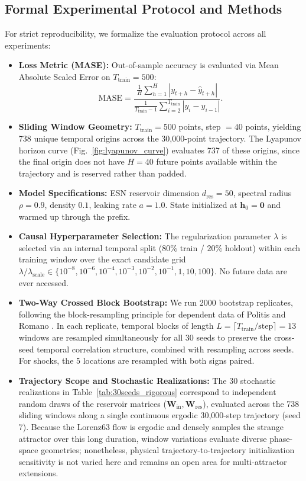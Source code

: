 \documentclass[aip,cha,reprint,amsmath,amssymb]{revtex4-2}
\begin{document}
\subsection{Formal Experimental Protocol and Methods}

For strict reproducibility, we formalize the evaluation protocol across all experiments:
\begin{itemize}
    \item \textbf{Loss Metric (MASE):} Out-of-sample accuracy is evaluated via Mean Absolute Scaled Error on $T_{\text{train}}=500$:
    \begin{equation}
    \text{MASE} = \frac{\frac{1}{H}\sum_{h=1}^H |y_{t+h} - \hat{y}_{t+h}|}{\frac{1}{T_{\text{train}}-1}\sum_{i=2}^{T_{\text{train}}} |y_i - y_{i-1}|}.
    \end{equation}
    \item \textbf{Sliding Window Geometry:} $T_{\text{train}} = 500$ points, step $= 40$ points, yielding 738 unique temporal origins across the 30,000-point trajectory. The Lyapunov horizon curve (Fig.~\ref{fig:lyapunov_curve}) evaluates 737 of these origins, since the final origin does not have $H=40$ future points available within the trajectory and is reserved rather than padded.
    \item \textbf{Model Specifications:} ESN reservoir dimension $d_{\text{res}} = 50$, spectral radius $\rho = 0.9$, density $0.1$, leaking rate $a = 1.0$. State initialized at $\mathbf{h}_0 = \mathbf{0}$ and warmed up through the prefix.
    \item \textbf{Causal Hyperparameter Selection:} The regularization parameter $\lambda$ is selected via an internal temporal split ($80\%$ train / $20\%$ holdout) within each training window over the exact candidate grid $\lambda / \lambda_{\text{scale}} \in \{10^{-8}, 10^{-6}, 10^{-4}, 10^{-3}, 10^{-2}, 10^{-1}, 1, 10, 100\}$. No future data are ever accessed.
    \item \textbf{Two-Way Crossed Block Bootstrap:} We run 2000 bootstrap replicates, following the block-resampling principle for dependent data of Politis and Romano \cite{politis1994stationary}. In each replicate, temporal blocks of length $L = \lceil T_{\text{train}} / \text{step} \rceil = 13$ windows are resampled simultaneously for all 30 seeds to preserve the cross-seed temporal correlation structure, combined with resampling across seeds. For shocks, the 5 locations are resampled with both signs paired.
    \item \textbf{Trajectory Scope and Stochastic Realizations:} The 30 stochastic realizations in Table~\ref{tab:30seeds_rigorous} correspond to independent random draws of the reservoir matrices ($\mathbf{W}_{\text{in}}, \mathbf{W}_{\text{res}}$), evaluated across the 738 sliding windows along a single continuous ergodic 30,000-step trajectory (seed 7). Because the Lorenz63 flow is ergodic and densely samples the strange attractor over this long duration, window variations evaluate diverse phase-space geometries; nonetheless, physical trajectory-to-trajectory initialization sensitivity is not varied here and remains an open area for multi-attractor extensions.

\end{itemize}
\end{document}
